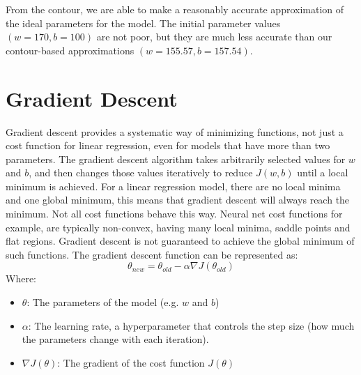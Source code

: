\documentclass{article}
\begin{document}
\noindent From the contour, we are able to make a reasonably accurate approximation of the ideal parameters for the model. The initial parameter values $(w=170, b=100)$ are not poor, but they are much less accurate than our contour-based approximations $(w=155.57, b=157.54)$.

\section{Gradient Descent}
Gradient descent provides a systematic way of minimizing functions, not just a cost function for linear regression, even for models that have more than two parameters. The gradient descent algorithm takes arbitrarily selected values for $w$ and $b$, and then changes those values iteratively to reduce $J(w,b)$ until a local minimum is achieved. For a linear regression model, there are no local minima and one global minimum, this means that gradient descent will always reach the minimum. Not all cost functions behave this way. Neural net cost functions for example, are typically non-convex, having many local minima, saddle points and flat regions. Gradient descent is not guaranteed to achieve the global minimum of such functions. The gradient descent function can be represented as:
\[\theta_{new} = \theta_{old} - \alpha \nabla J(\theta_{old}) \]
\noindent Where:

\begin{itemize}
\item $\theta$: The parameters of the model (e.g. $w$ and $b$)
\item $\alpha$: The learning rate, a hyperparameter that controls the step size (how much the parameters change with each iteration).
\item $\nabla J(\theta)$: The gradient of the cost function $J(\theta)$
\end{itemize}
\end{document}
